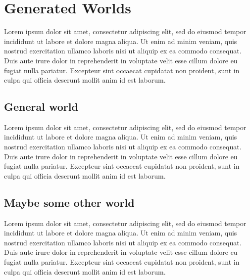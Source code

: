 \section{Generated Worlds}
Lorem ipsum dolor sit amet, consectetur adipiscing elit, sed do eiusmod tempor incididunt ut labore et dolore magna aliqua. 
Ut enim ad minim veniam, quis nostrud exercitation ullamco laboris nisi ut aliquip ex ea commodo consequat. 
Duis aute irure dolor in reprehenderit in voluptate velit esse cillum dolore eu fugiat nulla pariatur. 
Excepteur sint occaecat cupidatat non proident, sunt in culpa qui officia deserunt mollit anim id est laborum.
	\subsection{General world}
	Lorem ipsum dolor sit amet, consectetur adipiscing elit, sed do eiusmod tempor incididunt ut labore et dolore magna aliqua. 
	Ut enim ad minim veniam, quis nostrud exercitation ullamco laboris nisi ut aliquip ex ea commodo consequat. 
	Duis aute irure dolor in reprehenderit in voluptate velit esse cillum dolore eu fugiat nulla pariatur. 
	Excepteur sint occaecat cupidatat non proident, sunt in culpa qui officia deserunt mollit anim id est laborum.
	\subsection{Maybe some other world}
	Lorem ipsum dolor sit amet, consectetur adipiscing elit, sed do eiusmod tempor incididunt ut labore et dolore magna aliqua. 
	Ut enim ad minim veniam, quis nostrud exercitation ullamco laboris nisi ut aliquip ex ea commodo consequat. 
	Duis aute irure dolor in reprehenderit in voluptate velit esse cillum dolore eu fugiat nulla pariatur. 
	Excepteur sint occaecat cupidatat non proident, sunt in culpa qui officia deserunt mollit anim id est laborum.
	